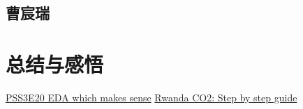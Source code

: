 \documentclass[fontset=windows]{article}
\begin{document}
\subsection{曹宸瑞}

\section{总结与感悟}

\begin{thebibliography}{100}  
\href{https://www.kaggle.com/code/ambrosm/pss3e20-eda-which-makes-sense}{PSS3E20 EDA which makes sense}
\href{https://www.kaggle.com/code/kacperrabczewski/rwanda-co2-step-by-step-guide}{Rwanda CO2: Step by step guide}
\end{thebibliography}
\end{document}
